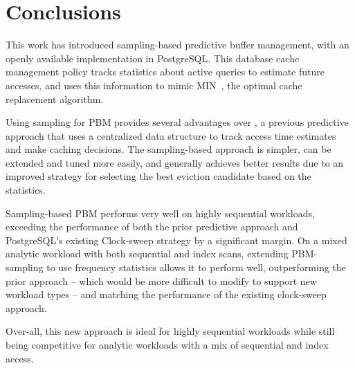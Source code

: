 
\chapter{Conclusions}
\label{ch:conclusion}

This work has introduced sampling-based predictive buffer management, with an openly available implementation in PostgreSQL. This database cache management policy tracks statistics about active queries to estimate future accesses, and uses this information to mimic MIN~\cite{beladyMIN}, the optimal cache replacement algorithm.

Using sampling for PBM provides several advantages over \cite{pbm}, a previous predictive approach that uses a centralized data structure to track access time estimates and make caching decisions. The sampling-based approach is simpler, can be extended and tuned more easily, and generally achieves better results due to an improved strategy for selecting the best eviction candidate based on the statistics.

Sampling-based PBM performs very well on highly sequential workloads, exceeding the performance of both the prior predictive approach and PostgreSQL's existing Clock-sweep strategy by a significant margin. On a mixed analytic workload with both sequential and index scans, extending PBM-sampling to use frequency statistics allows it to perform well, outperforming the prior approach -- which would be more difficult to modify to support new workload types -- and matching the performance of the existing clock-sweep approach.

Over-all, this new approach is ideal for highly sequential workloads while still being competitive for analytic workloads with a mix of sequential and index access.


